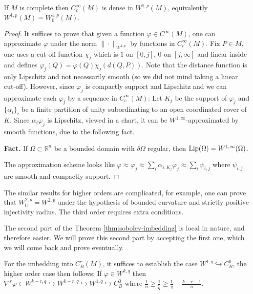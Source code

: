 \documentclass[11pt]{article}
\begin{document}
\begin{proposition}[\( W^{1,p} = W_0^{1,p} \)]
\label{prop:Cc-dense-W1p}
If \(M\) is complete then \(C_c^\infty(M)\) is dense in \(W^{1,p}(M)\), equivalently \(W^{1,p}(M) = W^{1,p}_0(M)\).
\end{proposition}
\begin{proof}
It suffices to prove that given a function \(\varphi\in C^\infty(M)\), one can
approximate \(\varphi\) under the norm \(\|\cdot \|_{W^{1,p}}\) by functions in \(C^\infty_c(M)\). Fix \(P\in M\), one uses a cut-off function \(\chi_j\) which is \(1\) on \([0,j]\),
\(0\) on \([j,\infty]\) and linear inside and defines \(\varphi_j (Q) = \varphi(Q)
\chi_j(d(Q,P))\). Note that the distance function is only Lipschitz and not necessarily
smooth (so we did not mind taking a linear cut-off). However, since \(\varphi_j\) is compactly
support and Lipschitz and we can approximate each \(\varphi_j\) by a sequence in \(C_c^\infty(M)\): Let \(K_j\) be the support of \(\varphi_j\) and \(\{\alpha_i\}_i\) be
a finite partition of unity subordinating to an open coordinated cover of \(K\). Since
\(\alpha_i\varphi_j\) is Lipschitz, viewed in a chart, it can be \(W^{1,\infty}\)-approximated by smooth functions, due to the following fact.

\textbf{Fact.} If \(\Omega\subset \mathbb{R}^n\) be a bounded domain with \(\delta \Omega\)
regular, then \({\rm Lip}(\Omega) = W^{1,\infty}(\Omega)\).

The approximation scheme looks like
\(\varphi \approx \varphi_j \approx \sum_i \alpha_{i,K_j}\varphi_j \approx\sum_i \psi_{i,j}\)
where \(\psi_{i,j}\) are smooth and compactly support.
\end{proof}

\begin{remark}
The similar results for higher orders are complicated, for example, one can prove that \(W^{2,p}_0 = W^{2,p}\) under the hypothesis of bounded curvature and strictly positive
injectivity radius. The third order requires extra conditions.
\end{remark}

The second part of the Theorem \ref{thm:sobolev-imbedding} is local in nature, and therefore easier. We will prove
this second part by accepting the first one, which we will come back and prove eventually.

For the imbedding
into \(C^r_B(M)\), it suffices to establish the case \(W^{1,q} \hookrightarrow C^0_B\), the higher order case then follows: If \(\varphi\in W^{k,q}\) then \(\nabla^r\varphi\in W^{k-r,q} \hookrightarrow
   W^{k-r,q} \hookrightarrow W^{1,\tilde q} \hookrightarrow C^0_B\)
where \(\frac{1}{n} \geq \frac{1}{\tilde q}\geq \frac{1}{q}-\frac{k-r-1}{n}\). 
\end{document}
